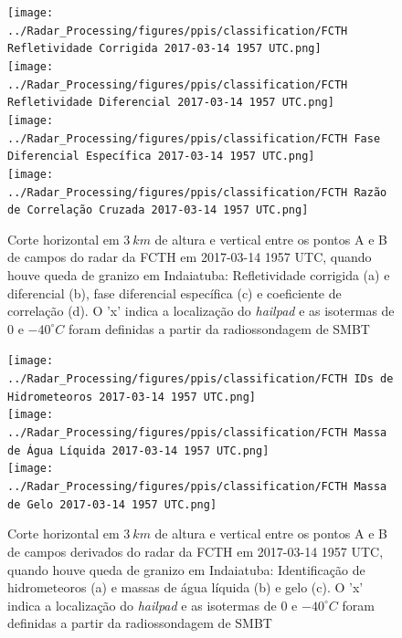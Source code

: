 \begin{figure}[hp]
	\centering
	\caption{Corte horizontal em $3\:km$ de altura e vertical entre os pontos A e B de campos do radar da FCTH em 2017-03-14 1957 UTC, quando houve queda de granizo em Indaiatuba: Refletividade corrigida (a) e diferencial (b), fase diferencial específica (c) e coeficiente de correlação (d). O 'x' indica a localização do \textit{hailpad} e as isotermas de $0$ e $-40^{\circ}C$ foram definidas a partir da radiossondagem de SMBT}
	\label{radar_20170314_2}
	\vspace{-5pt}
	\texttt{[image: ../Radar\_Processing/figures/ppis/classification/FCTH Refletividade Corrigida 2017-03-14 1957 UTC.png]} \\
	\vspace{-5pt}
	\texttt{[image: ../Radar\_Processing/figures/ppis/classification/FCTH Refletividade Diferencial 2017-03-14 1957 UTC.png]} \\
	\vspace{-5pt}
	\texttt{[image: ../Radar\_Processing/figures/ppis/classification/FCTH Fase Diferencial Específica 2017-03-14 1957 UTC.png]} \\
	\vspace{-5pt}
	\texttt{[image: ../Radar\_Processing/figures/ppis/classification/FCTH Razão de Correlação Cruzada 2017-03-14 1957 UTC.png]} \\
\end{figure}

\begin{figure}[htb]
	\centering
	\caption{Corte horizontal em $3\:km$ de altura e vertical entre os pontos A e B de campos derivados do radar da FCTH em 2017-03-14 1957 UTC, quando houve queda de granizo em Indaiatuba: Identificação de hidrometeoros (a) e massas de água líquida (b) e gelo (c). O 'x' indica a localização do \textit{hailpad} e as isotermas de $0$ e $-40^{\circ}C$ foram definidas a partir da radiossondagem de SMBT} 
	\label{radar_derived_20170314_2}
	\vspace{-5pt}
	\texttt{[image: ../Radar\_Processing/figures/ppis/classification/FCTH IDs de Hidrometeoros 2017-03-14 1957 UTC.png]} \\
	\vspace{-5pt}
	\texttt{[image: ../Radar\_Processing/figures/ppis/classification/FCTH Massa de Água Líquida 2017-03-14 1957 UTC.png]} \\
	\vspace{-5pt}
	\texttt{[image: ../Radar\_Processing/figures/ppis/classification/FCTH Massa de Gelo 2017-03-14 1957 UTC.png]} \\
\end{figure}

